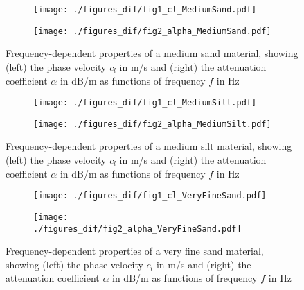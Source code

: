 \documentclass{article}[a4paper, 12pt]
\begin{document}
\begin{figure}[h!]
    \centering
    \begin{subfigure}[b]{0.45\textwidth}  %
        \texttt{[image: ./figures\_dif/fig1\_cl\_MediumSand.pdf]}
    \end{subfigure}
    \hspace{0.15cm} 
    \begin{subfigure}[b]{0.45\textwidth}
        \texttt{[image: ./figures\_dif/fig2\_alpha\_MediumSand.pdf]}
    \end{subfigure}
    
    \caption{ Frequency-dependent properties of a  medium sand material, showing (left) the phase velocity $c_l$ in m/s and (right) the attenuation coefficient 
    $\alpha$ in dB/m as functions of frequency $f$ in Hz}
\end{figure}

\begin{figure}[h!]
    \centering
    \begin{subfigure}[b]{0.45\textwidth}  %
        \texttt{[image: ./figures\_dif/fig1\_cl\_MediumSilt.pdf]}
    \end{subfigure}
    \hspace{0.15cm} 
    \begin{subfigure}[b]{0.45\textwidth}
        \texttt{[image: ./figures\_dif/fig2\_alpha\_MediumSilt.pdf]}
    \end{subfigure}
    
    \caption{ Frequency-dependent properties of a  medium silt material, showing (left) the phase velocity $c_l$ in m/s and (right) the attenuation coefficient 
    $\alpha$ in dB/m as functions of frequency $f$ in Hz}
\end{figure}

\begin{figure}[h!]
    \centering
    \begin{subfigure}[b]{0.45\textwidth}  %
        \texttt{[image: ./figures\_dif/fig1\_cl\_VeryFineSand.pdf]}
    \end{subfigure}
    \hspace{0.15cm} 
    \begin{subfigure}[b]{0.45\textwidth}
        \texttt{[image: ./figures\_dif/fig2\_alpha\_VeryFineSand.pdf]}
    \end{subfigure}
    
    \caption{ Frequency-dependent properties of a very fine sand material, showing (left) the phase velocity $c_l$ in m/s and (right) the attenuation coefficient 
    $\alpha$ in dB/m as functions of frequency $f$ in Hz}
\end{figure}





\clearpage
\printbibliography
\end{document}
